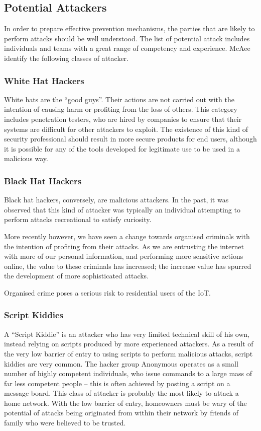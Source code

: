 \documentclass[10pt,journal,compsoc]{IEEEtran}
\begin{document}
\subsection{Potential Attackers}
In order to prepare effective prevention mechanisms, the parties that are
likely to perform attacks should be well understood. The list of potential
attack includes individuals and teams with a great range of competency and
experience. McAee identify the following classes of attacker\cite{McAfee2011}.  

\subsubsection{White Hat Hackers}
White hats are the ``good guys''. Their actions are not carried out with
the intention of causing harm or profiting from the loss of others. This
category includes penetration testers, who are hired by companies to ensure
that their systems are difficult for other attackers to exploit. The existence
of this kind of security professional should result in more secure products for
end users, although it is possible for any of the tools developed for
legitimate use to be used in a malicious way.

\subsubsection{Black Hat Hackers}
Black hat hackers, conversely, are malicious attackers. In the past, it was
observed that this kind of attacker was typically an individual attempting to
perform attacks recreational to satisfy curiosity.  

More recently however, we have seen a change towards organised criminals with
the intention of profiting from their attacks. As we are entrusting the
internet with more of our personal information, and performing more sensitive
actions online, the value to these criminals has increased; the increase value
has spurred the development of more sophisticated attacks. 

Organised crime poses a serious risk to residential users of the IoT. 

\subsubsection{Script Kiddies}
A ``Script Kiddie'' is an attacker who has very limited technical skill of his
own, instead relying on scripts produced by more experienced attackers. As a
result of the very low barrier of entry to using scripts to perform malicious
attacks, script kiddies are very common. The hacker group Anonymous operates as
a small number of highly competent individuals, who issue commands to a large
mass of far less competent people -- this is often achieved by posting a script
on a message board. This class of attacker is probably the most likely to
attack a home network. With the low barrier of entry, homeowners must be wary
of the potential of attacks being originated from within their network by
friends of family who were believed to be trusted.  
\end{document}
